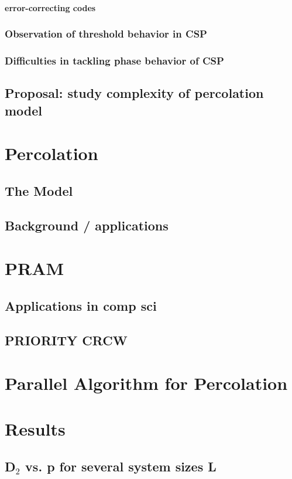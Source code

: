 \documentclass{umthesis}
\begin{document}
\paragraph{error-correcting codes}
\label{sec-4.1.1.1.4}
\subsubsection{Observation of threshold behavior in CSP}
\label{sec-4.1.1.2}
\subsubsection{Difficulties in tackling phase behavior of CSP}
\label{sec-4.1.1.3}
\subsection{Proposal: study complexity of percolation model}
\label{sec-4.1.2}
\section{Percolation}
\label{sec-4.2}
\subsection{The Model}
\label{sec-4.2.1}
\subsection{Background / applications}
\label{sec-4.2.2}
\section{PRAM}
\label{sec-4.3}
\subsection{Applications in comp sci}
\label{sec-4.3.1}
\subsection{PRIORITY CRCW}
\label{sec-4.3.2}
\section{Parallel Algorithm for Percolation}
\label{sec-4.4}
\section{Results}
\label{sec-4.5}
\subsection{D$_2$ vs. p for several system sizes L}
\label{sec-4.5.1}
\end{document}
